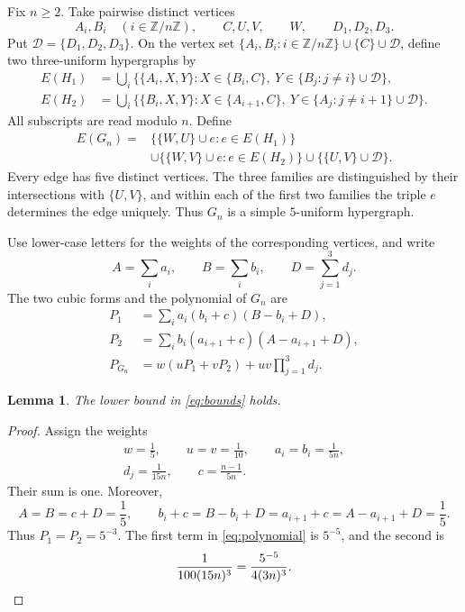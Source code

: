 \documentclass[11pt]{article}
\newtheorem{lemma}[theorem]{Lemma}
\numberwithin{equation}{section}
\newcommand{\D}{\mathcal D}
\begin{document}
Fix \(n\ge2\). Take pairwise distinct vertices
\[
 A_i,B_i\quad(i\in\mathbb Z/n\mathbb Z),\qquad C,U,V,
 \qquad W,\qquad D_1,D_2,D_3.
\]
Put \(\D=\{D_1,D_2,D_3\}\).
On the vertex set \(\{A_i,B_i:i\in\mathbb Z/n\mathbb Z\}\cup
\{C\}\cup\D\), define two three-uniform hypergraphs by
\begin{align*}
 E(H_1)&=\bigcup_i
 \bigl\{\{A_i,X,Y\}:X\in\{B_i,C\},\
 Y\in\{B_j:j\ne i\}\cup\D\bigr\},\\
 E(H_2)&=\bigcup_i
 \bigl\{\{B_i,X,Y\}:X\in\{A_{i+1},C\},\
 Y\in\{A_j:j\ne i+1\}\cup\D\bigr\}.
\end{align*}
All subscripts are read modulo \(n\). Define
\begin{equation}\label{eq:edges}
 \begin{split}
 E(G_n)={}&\bigl\{\{W,U\}\cup e:e\in E(H_1)\bigr\}\\
 &\cup\bigl\{\{W,V\}\cup e:e\in E(H_2)\bigr\}
 \cup\bigl\{\{U,V\}\cup\D\bigr\}.
 \end{split}
\end{equation}
Every edge has five distinct vertices. The three families are
distinguished by their intersections with \(\{U,V\}\), and within
each of the first two families the triple \(e\) determines the edge
uniquely. Thus \(G_n\) is a simple \(5\)-uniform hypergraph.

Use lower-case letters for the weights of the corresponding vertices,
and write
\[
 A=\sum_i a_i,\qquad B=\sum_i b_i,\qquad
 D=\sum_{j=1}^{3}d_j.
\]
The two cubic forms and the polynomial of \(G_n\) are
\begin{align}
 P_1&=\sum_i a_i(b_i+c)(B-b_i+D),\label{eq:p1}\\
 P_2&=\sum_i b_i(a_{i+1}+c)(A-a_{i+1}+D),\label{eq:p2}\\
 P_{G_n}&=w(uP_1+vP_2)+uv\prod_{j=1}^{3}d_j.
 \label{eq:polynomial}
\end{align}

\begin{lemma}\label{lem:lower}
The lower bound in \eqref{eq:bounds} holds.
\end{lemma}

\begin{proof}
Assign the weights
\begin{equation}\label{eq:weights}
 \begin{gathered}
 w=\frac1{5},\qquad u=v=\frac1{10},\qquad
 a_i=b_i=\frac1{5n},\\
 d_j=\frac1{15n},\qquad c=\frac{n-1}{5n}.
 \end{gathered}
\end{equation}
Their sum is one. Moreover,
\[
 A=B=c+D=\frac1{5},\qquad
 b_i+c=B-b_i+D=a_{i+1}+c=A-a_{i+1}+D=\frac1{5}.
\]
Thus \(P_1=P_2=5^{-3}\). The first term in
\eqref{eq:polynomial} is \(5^{-5}\), and the second is
\[
 \frac1{100(15n)^{3}}
 =\frac{5^{-5}}{4(3n)^{3}}.\qedhere
\]
\end{proof}
\end{document}
